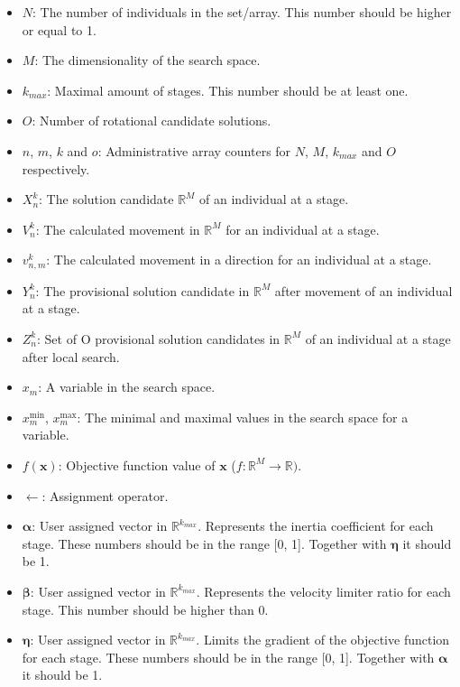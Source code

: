 \documentclass[runningheads]{llncs}
\begin{document}
\begin{itemize}
    \item $N$: The number of individuals in the set/array. This number should be higher or equal to 1.
    \item $M$: The dimensionality of the search space.
    \item $k_{max}$: Maximal amount of stages. This number should be at least one.
    \item $O$: Number of rotational candidate solutions.
    \item $n$, $m$, $k$ and $o$: Administrative array counters for $N$, $M$, $k_{max}$ and $O$ respectively.
    \item $X_n^k$: The solution candidate $\mathds{R}^M$ of an individual at a stage.
    \item $V_n^k$: The calculated movement in $\mathds{R}^M$ for an individual at a stage.
    \item $v_{n,m}^k$: The calculated movement in a direction for an individual at a stage.
    \item $Y_n^k$: The provisional solution candidate in $\mathds{R}^M$ after movement of an individual at a stage.
    \item $Z_n^{k}$: Set of O provisional solution candidates in $\mathds{R}^M$ of an individual at a stage after local search.
    \item $x_m$: A variable in the search space.
    \item $x_m^{\text{min}}$, $x_m^{\text{max}}$: The minimal and maximal values in the search space for a variable.
    \item $f(\mathbf{x})$: Objective function value of $\mathbf{x}$ ($f: \mathds{R}^M \rightarrow \mathds{R})$.
    \item $\leftarrow$: Assignment operator.
    \item $\boldsymbol{\alpha}$: User assigned vector in $\mathds{R}^{k_{max}}$. Represents the inertia coefficient for each stage. These numbers should be in the range [0, 1]. Together with $\boldsymbol{\eta}$ it should be 1.
    \item $\boldsymbol{\beta}$: User assigned vector in $\mathds{R}^{k_{max}}$. Represents the velocity limiter ratio for each stage. This number should be higher than 0.
    \item $\boldsymbol{\eta}$: User assigned vector in $\mathds{R}^{k_{max}}$. Limits the gradient of the objective function for each stage. These numbers should be in the range [0, 1]. Together with $\boldsymbol{\alpha}$ it should be 1.

\end{itemize}
\end{document}
